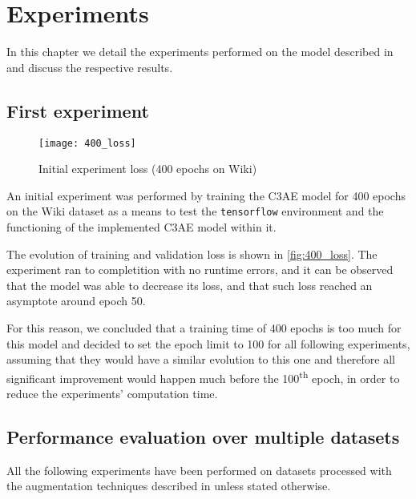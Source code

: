 
\chapter{Experiments}
\label{chp:experiments}
In this chapter we detail the experiments performed on the model described in
 and discuss the respective results.

\section{First experiment}

\begin{wrapfigure}[17]{r}{0.5\textwidth}
    \centering
    \texttt{[image: 400\_loss]}
    \caption{Initial experiment loss (400 epochs on Wiki)}
    \label{fig:400_loss}
\end{wrapfigure}

An initial experiment was performed by training the C3AE model for
400 epochs on the Wiki dataset as a means to test the \texttt{tensorflow} environment
and the functioning of the implemented C3AE model within it.

The evolution of training and validation loss is shown in \autoref{fig:400_loss}.
The experiment ran to completition with no runtime errors, and
it can be observed that the model was able to decrease its loss,
and that such loss reached an asymptote around epoch 50.

For this reason, we concluded that a training time of 400 epochs
is too much for this model and decided to set the epoch limit to 100 for
all following experiments, assuming that they would have a similar
evolution to this one and therefore all significant improvement
would happen much before the 100\textsuperscript{th} epoch,
in order to reduce the experiments' computation time.

\section{Performance evaluation over multiple datasets}

All the following experiments have been performed on datasets processed with the 
augmentation techniques described in  unless stated otherwise.

